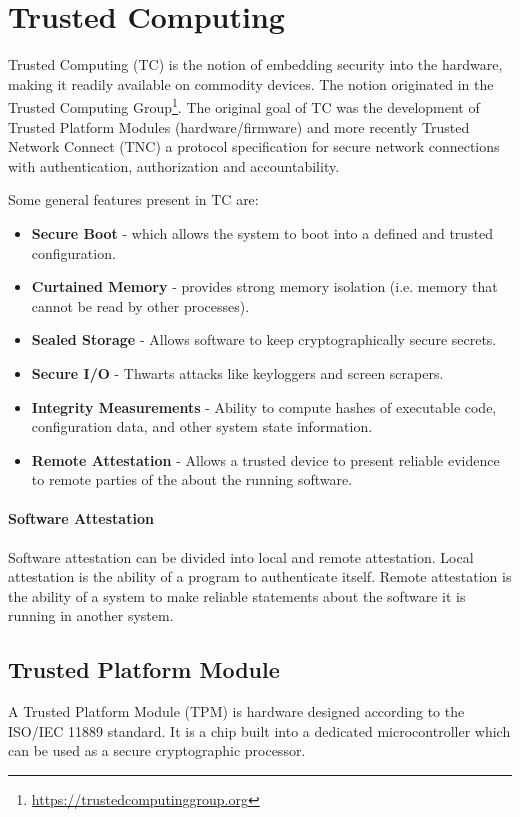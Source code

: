 \section{Trusted Computing}

Trusted Computing (TC) is the notion of embedding security into the hardware,
making it readily available on commodity devices.
The notion originated in the Trusted Computing Group\footnote{\url{https://trustedcomputinggroup.org}}.
The original goal of TC was the development of Trusted Platform Modules (hardware/firmware)
and more recently Trusted Network Connect (TNC) a protocol specification for secure network connections
with authentication, authorization and accountability.

Some general features present in TC are:
\begin{itemize}
    \item \textbf{Secure Boot} - which allows the system to boot into a defined and trusted configuration.
    \item \textbf{Curtained Memory} - provides strong memory isolation (i.e. memory that cannot be read by other processes).
    \item \textbf{Sealed Storage} - Allows software to keep cryptographically secure secrets.
    \item \textbf{Secure I/O} - Thwarts attacks like keyloggers and screen scrapers.
    \item \textbf{Integrity Measurements} - Ability to compute hashes of executable code,
    configuration data, and other system state information.
    \item \textbf{Remote Attestation} - Allows a trusted device to present reliable evidence to remote parties of the about the running software.
\end{itemize}

\paragraph{Software Attestation}
Software attestation can be divided into local and remote attestation.
Local attestation is the ability of a program to authenticate itself.
Remote attestation is the ability of a system to make reliable statements about the software it is running in another system.

\subsection{Trusted Platform Module}
A Trusted Platform Module (TPM) is hardware designed according to the ISO/IEC 11889 standard.
It is a chip built into a dedicated microcontroller which can be used as a secure cryptographic processor.

